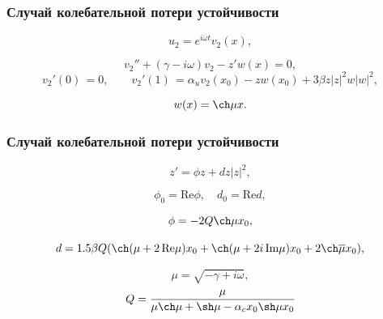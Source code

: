 \documentclass[fullscreen=true, unicode, bookmarks=false]{beamer}
\begin{document}
\begin{frame}
\frametitle{ Случай колебательной потери устойчивости }

$$ u_2 = e^{i \omega t} v_2(x), $$

\bigskip

\begin{equation}
	v_2'' + (\gamma - i \omega) v_2 - z' w(x) = 0,
\end{equation}
\begin{equation}
	v_2'(0) \, = 0, \qquad v_2'(1) \, = \alpha_u v_2(x_0) - z w(x_0) + 3\beta z|z|^2 w|w|^2,
\end{equation}

$$ w(x) = \ch \mu x. $$

\end{frame}

\begin{frame}
\frametitle{ Случай колебательной потери устойчивости }

\begin{equation}
	z' = \phi z + d z |z|^2,
\end{equation}

$$ \phi_0 = \mbox{Re} \phi, \quad d_0 = \mbox{Re} d, $$

\bigskip

$$ \phi = -2Q\ch \mu x_0, $$

$$ d = 1.5 \beta Q ( \ch(\mu + 2\,\mbox{Re}\mu)x_0 + \ch(\mu + 2i\,\mbox{Im}\mu)x_0 + 2\ch\overline{\mu}x_0 ), $$

$$ \mu = \sqrt{-\gamma + i \omega}, $$ 
$$ Q = \frac{\mu}{\mu \ch \mu + \sh \mu - \alpha_c x_0 \sh \mu x_0} $$

\end{frame}
\end{document}
